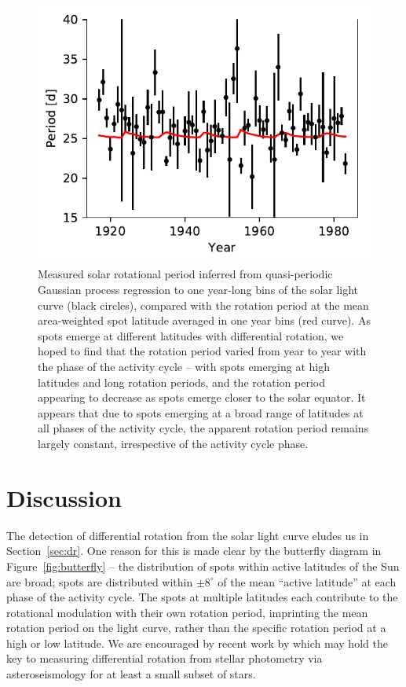 \begin{figure}
    \centering
    \includegraphics[scale=0.9]{howard/period_cycle.pdf}
    \caption{Measured solar rotational period inferred from quasi-periodic Gaussian process regression to one year-long bins of the solar light curve (black circles), compared with the rotation period at the mean area-weighted spot latitude averaged in one year bins (red curve). As spots emerge at different latitudes with differential rotation, we hoped to find that the rotation period varied from year to year with the phase of the activity cycle -- with spots emerging at high latitudes and long rotation periods, and the rotation period appearing to decrease as spots emerge closer to the solar equator. It appears that due to spots emerging at a broad range of latitudes at all phases of the activity cycle, the apparent rotation period remains largely constant, irrespective of the activity cycle phase.}
    \label{fig:period_cycle}
\end{figure}


\section{Discussion} \label{sec:discussion}

The detection of differential rotation from the solar light curve eludes us in Section~\ref{sec:dr}. One reason for this is made clear by the butterfly diagram in Figure~\ref{fig:butterfly} -- the distribution of spots within active latitudes of the Sun are broad; spots are distributed within $\pm 8^\circ$ of the mean ``active latitude'' at each phase of the activity cycle. The spots at multiple latitudes each contribute to the rotational modulation with their own rotation period, imprinting the mean rotation period on the light curve, rather than the specific rotation period at a high or low latitude. We are encouraged by recent work by \citet{Benomar2018} which may hold the key to measuring differential rotation from stellar photometry via asteroseismology for at least a small subset of stars. 

